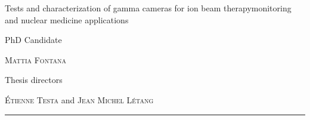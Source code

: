 \begin{titlepage}

\noindent
\textcolor{titlepagecolor}{\titlefont Tests and characterization \newline of gamma
cameras for \newline ion beam therapy\newline  monitoring \newline and nuclear medicine \newline applications}\par
\epigraph{PhD Candidate}%
{\textsc{Mattia Fontana}}

\epigraph{Thesis directors}%
{\textsc{\'{E}tienne Testa} and \textsc{Jean Michel L\'{e}tang}}
\null\vfill
\vspace*{1cm}
\noindent
\hfill
\begin{minipage}{0.35\linewidth}
    \begin{flushright}
        \printuniv
    \end{flushright}
\end{minipage}
%
\begin{minipage}{0.02\linewidth}
    \rule{1pt}{125pt}
\end{minipage}
\titlepagedecoration
\end{titlepage}

